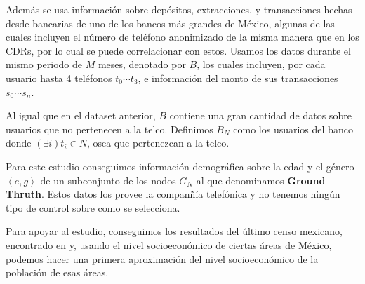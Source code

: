 \documentclass{article}
\begin{document}
Adem\'as se usa informaci\'on sobre dep\'ositos, extracciones, y transacciones hechas desde bancarias de uno de los bancos m\'as grandes de M\'exico, algunas de las cuales incluyen el n\'umero de tel\'efono anonimizado de la misma manera que en los CDRs, por lo cual se puede correlacionar con estos. Usamos los datos durante el mismo periodo de \( M \) meses, denotado por \( B \), los cuales incluyen, por cada usuario hasta 4 tel\'efonos \( t_0 \cdots t_3 \), e informaci\'on del monto de sus transacciones \( s_0 \cdots s_n \).

Al igual que en el dataset anterior, \( B \) contiene una gran cantidad de datos sobre usuarios que no pertenecen a la telco. Definimos \( B_N \) como los usuarios del banco donde \( \left( \exists i \right) t_i \in N \), osea que pertenezcan a la telco.

Para este estudio conseguimos informaci\'on demogr\'afica sobre la edad y el g\'enero \( \left<e, g\right> \) de un subconjunto de los nodos \( G_N \) al que denominamos \textbf{Ground Thruth}. Estos datos los provee la compan\~n\'ia telef\'onica y no tenemos ning\'un tipo de control sobre como se selecciona.

Para apoyar al estudio, conseguimos los resultados del \'ultimo censo mexicano, encontrado en  y, usando el nivel socioecon\'omico de ciertas \'areas de M\'exico, podemos hacer una primera aproximaci\'on del nivel socioecon\'omico de la poblaci\'on de esas \'areas.
\end{document}
